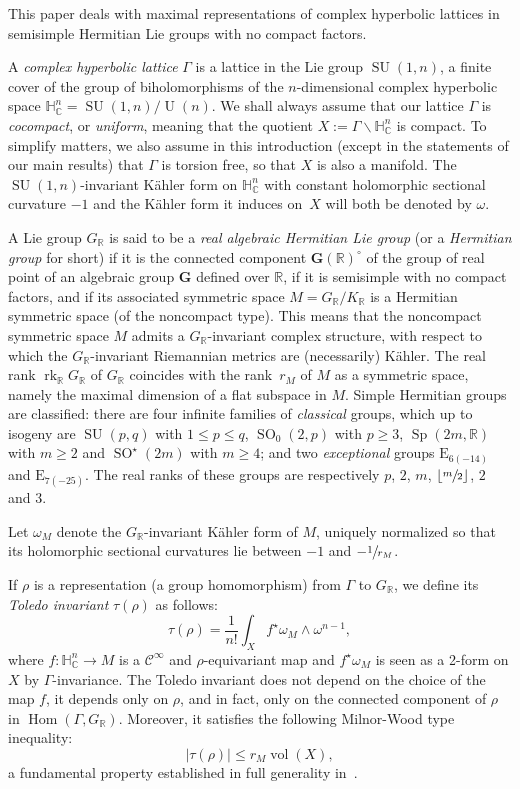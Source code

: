 \documentclass[JEP,XML,SOM,Unicode,NoFloatCountersInSection]{cedram}
\let\mathcal\mathscr
\theoremstyle{plain}
\theoremstyle{definition}
\DeclareMathOperator{\Hom}{Hom}
\DeclareMathOperator{\rk}{rk}
\DeclareMathOperator{\SO}{SO}
\DeclareMathOperator{\SU}{SU}
\DeclareMathOperator{\Sp}{Sp}
\DeclareMathOperator{\rU}{U}
\DeclareMathOperator{\vol}{vol}
\newcommand{\cC}{\mathcal{C}}
\newcommand{\bR}{\mathbb{R}}
\newcommand{\HC}{{\mathbb{H}^n_\mathbb{C}}}
\newcommand{\bfG}{\boldsymbol{G}}
\newcommand{\rkm}{{r_M}}
\begin{document}
This paper deals with maximal representations of complex hyperbolic lattices in semisimple Hermitian
Lie groups with no compact factors.

A \emph{complex hyperbolic lattice} $\Gamma$ is a lattice in the Lie group $\SU(1,n)$, a finite
cover of the group of biholomorphisms of the $n$-dimensional complex hyperbolic space
$\HC=\SU(1,n)/\rU(n)$.
We shall always
assume that our lattice $\Gamma$ is \emph{cocompact}, or \emph{uniform}, meaning that the quotient
$X:=\Gamma\backslash\HC$ is
compact. To simplify matters, we also assume in this introduction (except in the statements of
our main results) that $\Gamma$ is torsion free, so that $X$ is also a
manifold. The
$\SU(1,n)$-invariant Kähler form on $\HC$ with constant holomorphic sectional curvature $-1$ and the
Kähler form it induces on~$X$ will both be
denoted by $\omega$.

A Lie group $G_\bR$ is said to be a \emph{real algebraic Hermitian Lie group} (or a \emph{Hermitian
group} for short) if it is the connected component $\bfG(\bR)^\circ$ of the
group of real point of an algebraic group $\bfG$ defined over $\bR$, if it is semisimple
with no compact factors, and if its
associated symmetric space $M=G_\bR/K_\bR$ is a Hermitian symmetric space
(of the noncompact type).
This means that the noncompact symmetric space $M$ admits a
$G_\bR$-invariant complex structure, with respect to which the $G_\bR$-invariant Riemannian metrics
are (necessarily) Kähler. The real rank $\rk_\bR G_\bR$ of
$G_\bR$ coincides with the rank~$\rkm$ of $M$ as a symmetric space, namely the maximal dimension of
a flat subspace in $M$. Simple Hermitian groups are classified: there are four
infinite families of \emph{classical} groups, which up to isogeny are $\SU(p,q)$ with $1\leq p\leq
q$, $\SO_0(2,p)$ with $p\geq 3$, $\Sp(2m,\bR)$ with $m\geq 2$ and
$\SO^\star(2m)$ with $m\geq 4$; and two \emph{exceptional} groups $\mathrm{E}_{6(-14)}$ and
$\mathrm{E}_{7(-25)}$. The real ranks of these groups are respectively
$p$, $2$, $m$, $\lfloor \sfrac m2 \rfloor$, $2$ and $3$.

Let $\omega_M$ denote the $G_\bR$-invariant Kähler form of
$M$, uniquely normalized so that its holomorphic sectional curvatures lie between $-1$ and
$-\sfrac 1{\rkm}$.

If $\rho$ is a representation (a group homomorphism) from $\Gamma$ to $G_\bR$, we
define its \emph{Toledo invariant} $\tau(\rho)$ as follows:
$$
\tau(\rho)=\frac 1{n!}\int_X f^\star\omega_M\wedge\omega^{n-1},
$$
where $f:\HC\to M$ is a $\cC^\infty$ and $\rho$-equivariant map and $f^\star\omega_M$ is seen as a 2-form on $X$ by
$\Gamma$-invariance. The Toledo invariant does not depend on the choice of the map $f$, it depends only
on $\rho$, and in fact, only on the connected component of $\rho$ in $\Hom(\Gamma,G_\bR)$. Moreover, it
satisfies the following Milnor-Wood type inequality:
$$
|\tau(\rho)|\leq \rkm\vol(X),
$$
a fundamental property established in full generality in~\cite{BI07}.
\end{document}
